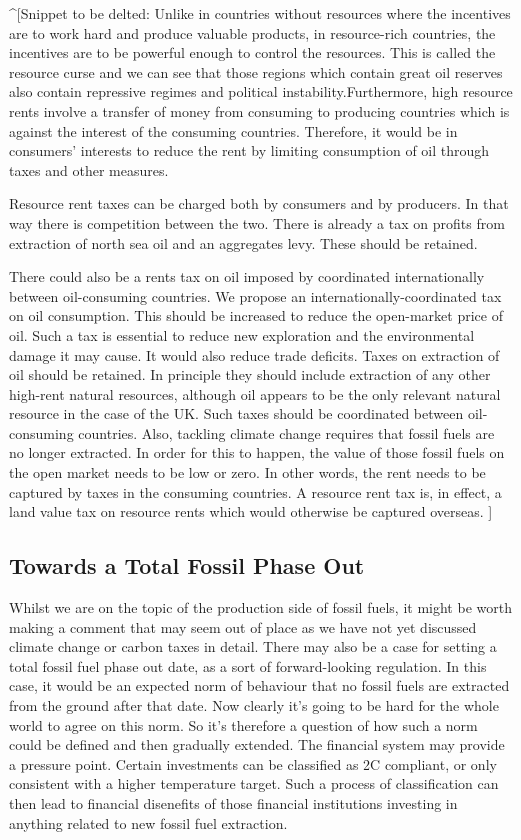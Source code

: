 \documentclass[]{tufte-handout}
\begin{document}
\^{}{[}Snippet to be delted: Unlike in countries without resources where
the incentives are to work hard and produce valuable products, in
resource-rich countries, the incentives are to be powerful enough to
control the resources. This is called the resource curse and we can see
that those regions which contain great oil reserves also contain
repressive regimes and political instability.Furthermore, high resource
rents involve a transfer of money from consuming to producing countries
which is against the interest of the consuming countries. Therefore, it
would be in consumers' interests to reduce the rent by limiting
consumption of oil through taxes and other measures.

Resource rent taxes can be charged both by consumers and by producers.
In that way there is competition between the two. There is already a tax
on profits from extraction of north sea oil and an aggregates levy.
These should be retained.

There could also be a rents tax on oil imposed by coordinated
internationally between oil-consuming countries. We propose an
internationally-coordinated tax on oil consumption. This should be
increased to reduce the open-market price of oil. Such a tax is
essential to reduce new exploration and the environmental damage it may
cause. It would also reduce trade deficits. Taxes on extraction of oil
should be retained. In principle they should include extraction of any
other high-rent natural resources, although oil appears to be the only
relevant natural resource in the case of the UK. Such taxes should be
coordinated between oil-consuming countries. Also, tackling climate
change requires that fossil fuels are no longer extracted. In order for
this to happen, the value of those fossil fuels on the open market needs
to be low or zero. In other words, the rent needs to be captured by
taxes in the consuming countries. A resource rent tax is, in effect, a
land value tax on resource rents which would otherwise be captured
overseas. {]}

\hypertarget{towards-a-total-fossil-phase-out}{%
\subsection{Towards a Total Fossil Phase
Out}\label{towards-a-total-fossil-phase-out}}

Whilst we are on the topic of the production side of fossil fuels, it
might be worth making a comment that may seem out of place as we have
not yet discussed climate change or carbon taxes in detail. There may
also be a case for setting a total fossil fuel phase out date, as a sort
of forward-looking regulation. In this case, it would be an expected
norm of behaviour that no fossil fuels are extracted from the ground
after that date. Now clearly it's going to be hard for the whole world
to agree on this norm. So it's therefore a question of how such a norm
could be defined and then gradually extended. The financial system may
provide a pressure point. Certain investments can be classified as 2C
compliant, or only consistent with a higher temperature target. Such a
process of classification can then lead to financial disenefits of those
financial institutions investing in anything related to new fossil fuel
extraction.
\end{document}
